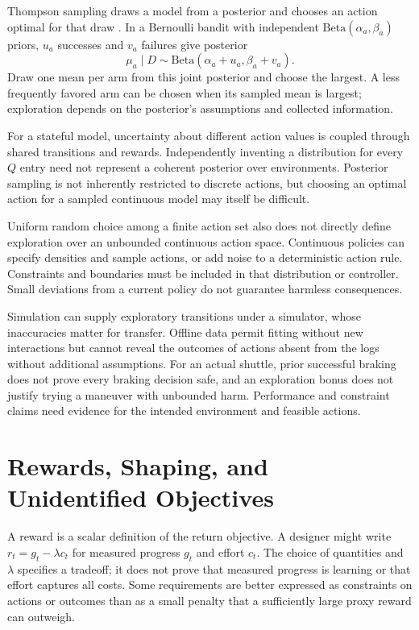 Thompson sampling draws a model from a posterior and chooses an action optimal for that draw \citep{chapelle2011thompson}. In a Bernoulli bandit with independent $\mathrm{Beta}(\alpha_a,\beta_a)$ priors, $u_a$ successes and $v_a$ failures give posterior
\[
\mu_a\mid D\sim\mathrm{Beta}(\alpha_a+u_a,\beta_a+v_a).
\]
Draw one mean per arm from this joint posterior and choose the largest. A less frequently favored arm can be chosen when its sampled mean is largest; exploration depends on the posterior's assumptions and collected information.

For a stateful model, uncertainty about different action values is coupled through shared transitions and rewards. Independently inventing a distribution for every $Q$ entry need not represent a coherent posterior over environments. Posterior sampling is not inherently restricted to discrete actions, but choosing an optimal action for a sampled continuous model may itself be difficult.

Uniform random choice among a finite action set also does not directly define exploration over an unbounded continuous action space. Continuous policies can specify densities and sample actions, or add noise to a deterministic action rule. Constraints and boundaries must be included in that distribution or controller. Small deviations from a current policy do not guarantee harmless consequences.

Simulation can supply exploratory transitions under a simulator, whose inaccuracies matter for transfer. Offline data permit fitting without new interactions but cannot reveal the outcomes of actions absent from the logs without additional assumptions. For an actual shuttle, prior successful braking does not prove every braking decision safe, and an exploration bonus does not justify trying a maneuver with unbounded harm. Performance and constraint claims need evidence for the intended environment and feasible actions.

\section{Rewards, Shaping, and Unidentified Objectives}

A reward is a scalar definition of the return objective. A designer might write $r_t=g_t-\lambda c_t$ for measured progress $g_t$ and effort $c_t$. The choice of quantities and $\lambda$ specifies a tradeoff; it does not prove that measured progress is learning or that effort captures all costs. Some requirements are better expressed as constraints on actions or outcomes than as a small penalty that a sufficiently large proxy reward can outweigh.

